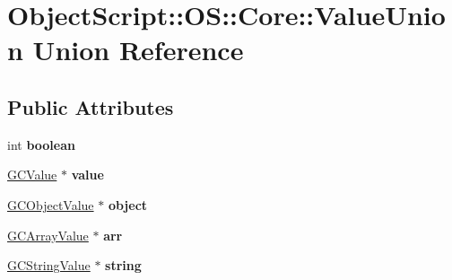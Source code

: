 \hypertarget{union_object_script_1_1_o_s_1_1_core_1_1_value_union}{}\section{Object\+Script\+:\+:OS\+:\+:Core\+:\+:Value\+Union Union Reference}
\label{union_object_script_1_1_o_s_1_1_core_1_1_value_union}
\subsection*{Public Attributes}
\begin{DoxyCompactItemize}
\item 
int {\bfseries boolean}\hypertarget{union_object_script_1_1_o_s_1_1_core_1_1_value_union_a7e303bf57d65f515e6e8ebd9241b2b2e}{}\label{union_object_script_1_1_o_s_1_1_core_1_1_value_union_a7e303bf57d65f515e6e8ebd9241b2b2e}

\item 
\hyperlink{struct_object_script_1_1_o_s_1_1_core_1_1_g_c_value}{G\+C\+Value} $\ast$ {\bfseries value}\hypertarget{union_object_script_1_1_o_s_1_1_core_1_1_value_union_acedaa7e421f190d45fdb31d33b9c0671}{}\label{union_object_script_1_1_o_s_1_1_core_1_1_value_union_acedaa7e421f190d45fdb31d33b9c0671}

\item 
\hyperlink{struct_object_script_1_1_o_s_1_1_core_1_1_g_c_object_value}{G\+C\+Object\+Value} $\ast$ {\bfseries object}\hypertarget{union_object_script_1_1_o_s_1_1_core_1_1_value_union_a3fbeb142f23c6c567563d36b46c448bb}{}\label{union_object_script_1_1_o_s_1_1_core_1_1_value_union_a3fbeb142f23c6c567563d36b46c448bb}

\item 
\hyperlink{struct_object_script_1_1_o_s_1_1_core_1_1_g_c_array_value}{G\+C\+Array\+Value} $\ast$ {\bfseries arr}\hypertarget{union_object_script_1_1_o_s_1_1_core_1_1_value_union_af4fbb33388feb6627055c34664ae0d58}{}\label{union_object_script_1_1_o_s_1_1_core_1_1_value_union_af4fbb33388feb6627055c34664ae0d58}

\item 
\hyperlink{struct_object_script_1_1_o_s_1_1_core_1_1_g_c_string_value}{G\+C\+String\+Value} $\ast$ {\bfseries string}\hypertarget{union_object_script_1_1_o_s_1_1_core_1_1_value_union_af27eb198510d1c6d16f1dfde49212a68}{}\label{union_object_script_1_1_o_s_1_1_core_1_1_value_union_af27eb198510d1c6d16f1dfde49212a68}


\end{DoxyCompactItemize}
